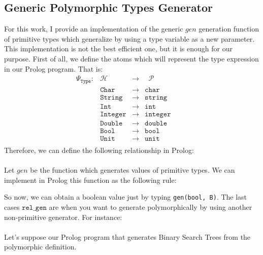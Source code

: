 \documentclass{report}
\theoremstyle{definition}
\theoremstyle{definition}
\newcommand{\ttt}[1]{\texttt{#1}}
\newcommand{\tav}{\;\;}
\begin{document}
	\subsection{Generic Polymorphic Types Generator}
	For this work, I provide an implementation of the generic $gen$ generation function of primitive types which generalize by using a type variable as a new parameter. This implementation is not the best efficient one, but it is enough for our purpose. First of all, we define the atoms which will represent the type expression in our Prolog program. That is:
	\begin{equation*}
		\begin{matrix}
			\Psi_{\ttt{Type}}: & \mathcal{H}   & \longrightarrow & \tav \mathcal{P} &   &   &   \\
			                   & \ttt{Char}    & \longrightarrow & \ttt{char}       &   &   &   \\
			                   & \ttt{String}  & \longrightarrow & \ttt{string}     &   &   &   \\
			                   & \ttt{Int}     & \longrightarrow & \ttt{int}        &   &   &   \\
			                   & \ttt{Integer} & \longrightarrow & \ttt{integer}    &   &   &   \\
			                   & \ttt{Double}  & \longrightarrow & \ttt{double}     &   &   &   \\
			                   & \ttt{Bool}    & \longrightarrow & \ttt{bool}       &   &   &   \\
			                   & \ttt{Unit}    & \longrightarrow & \ttt{unit}       &   &   &   \\
		\end{matrix}
	\end{equation*}
	Therefore, we can define the following relationship in Prolog:\\\\
	Let $gen$ be the function which generates values of primitive types. We can implement in Prolog this function as the following rule:
	
	So now, we can obtain a boolean value just by typing \ttt{gen(bool, B)}. The last cases $\ttt{rel\_gen}$ are when you want to generate polymorphically by using another non-primitive generator. For instance:\\\\
	Let's suppose our Prolog program that generates Binary Search Trees from the polymorphic definition.
\end{document}
